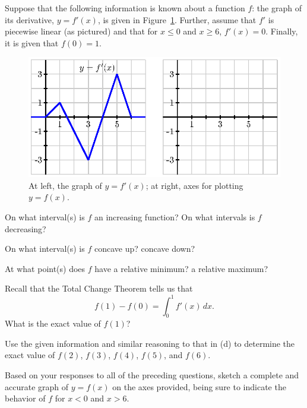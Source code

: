 \begin{pa} \label{PA:5.1}
Suppose that the following information is known about a function $f$:  the graph of its derivative, $y = f'(x)$, is given in Figure~\ref{F:5.1.PA1}.  Further, assume that $f'$ is piecewise linear (as pictured) and that for $x \le 0$ and $x \ge 6$, $f'(x) = 0$.  Finally, it is given that $f(0) = 1$.
\begin{figure}[h]
\begin{center}
\includegraphics{figures/5_1_PA1.eps}
\caption{At left, the graph of $y = f'(x)$; at right, axes for plotting $y = f(x)$.} \label{F:5.1.PA1}
\end{center}
\end{figure}
\ba
	\item On what interval(s) is $f$ an increasing function?  On what intervals is $f$ decreasing?
	\item On what interval(s) is $f$ concave up?  concave down?
	\item At what point(s) does $f$ have a relative minimum?  a relative maximum?
	\item Recall that the Total Change Theorem tells us that 
$$f(1) - f(0) = \int_0^1 f'(x) \, dx.$$
What is the exact value of $f(1)$?
	\item Use the given information and similar reasoning to that in (d) to determine the exact value of $f(2)$, $f(3)$, $f(4)$, $f(5)$, and $f(6)$.
	\item Based on your responses to all of the preceding questions, sketch a complete and accurate graph of $y = f(x)$ on the axes provided, being sure to indicate the behavior of $f$ for $x < 0$ and $x > 6$.
\ea
\end{pa} 
\afterpa